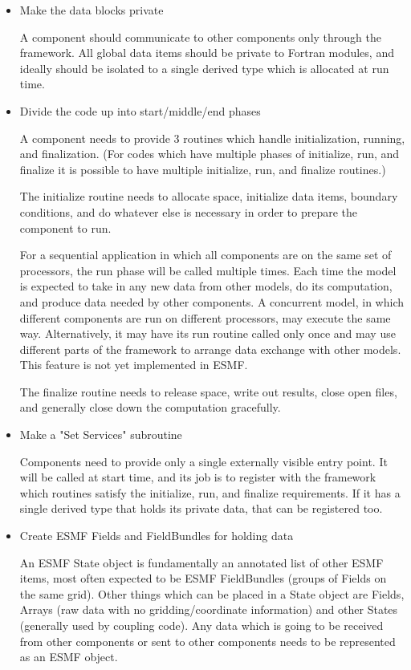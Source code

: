 \begin{itemize}
\item Make the data blocks private 

A component should communicate to other components only through the
framework.  All global data items should be private to Fortran modules,
and ideally should be isolated to a single derived type which is allocated
at run time.   

\item Divide the code up into start/middle/end phases 

A component needs to provide 3 routines which handle
initialization, running, and finalization.  (For codes which have
multiple phases of initialize, run, and finalize it is possible to have
multiple initialize, run, and finalize routines.)

The initialize routine needs to allocate space, initialize
data items, boundary conditions, and do whatever else is necessary in
order to prepare the component to run.

For a sequential application in which all components are on the same
set of processors, the run phase will
be called multiple times.  Each time the model is expected to take in
any new data from other models, do its computation, and produce data
needed by other components.   A concurrent model, in which different
components are run on different processors, may execute the same 
way.  Alternatively, it may have its run routine called
only once and may use different parts of the framework to arrange
data exchange with other models.  This feature is not yet implemented
in ESMF.

The finalize routine needs to release space, write out results,
close open files, and generally close down the computation gracefully.

\item Make a "Set Services" subroutine 

Components need to provide only a single externally visible entry point.
It will be called at start time, and its job is to register with the
framework which routines satisfy the initialize, run, and finalize
requirements.  If it has a single derived type that holds its private data,
that can be registered too.

\item Create ESMF Fields and FieldBundles for holding data

An ESMF State object is fundamentally an annotated list of other
ESMF items, most often expected to be ESMF FieldBundles (groups of
Fields on the same grid).  Other things which can be placed in a 
State object are Fields, Arrays (raw data with no gridding/coordinate 
information)
and other States (generally used by coupling code).  Any data which is
going to be received from other components or sent to other components
needs to be represented as an ESMF object.


\end{itemize}
